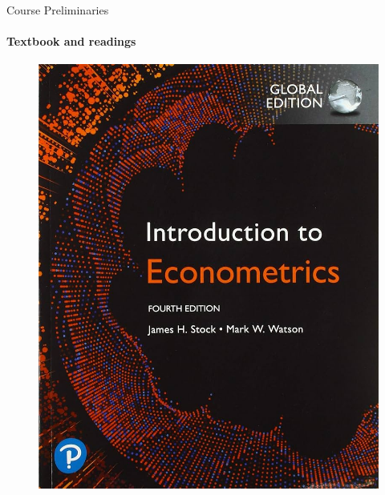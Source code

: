 \documentclass[11pt,english,handout]{beamer}
\begin{document}
\begin{frame}{Course Preliminaries}
	\framesubtitle{Textbook and readings}

	\begin{figure}
		\begin{minipage}{0.45\textwidth}
			\centering
			\includegraphics[width=\textwidth]{book_stockwatson.jpg}
		\end{minipage}
		\hfill
		\begin{minipage}{0.45\textwidth}
			\centering

\end{minipage}
\end{figure}
\end{frame}
\end{document}
